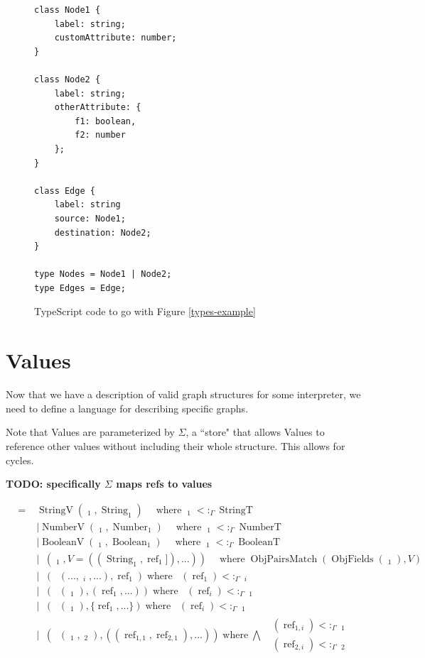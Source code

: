 \documentclass{article}
\DeclareMathOperator{\StringT}{StringT}
\DeclareMathOperator{\NumberT}{NumberT}
\DeclareMathOperator{\BooleanT}{BooleanT}
\DeclareMathOperator{\ListT}{ListT_\Gamma}
\DeclareMathOperator{\SetT}{SetT_\Gamma}
\DeclareMathOperator{\MapT}{MapT_\Gamma}
\DeclareMathOperator{\UnionT}{UnionT_\Gamma}
\DeclareMathOperator{\String}{String}
\DeclareMathOperator{\Number}{Number}
\DeclareMathOperator{\Boolean}{Boolean}
\DeclareMathOperator{\Type}{Type_\Gamma}
\DeclareMathOperator{\Value}{Value_\Sigma}
\DeclareMathOperator{\StringV}{StringV}
\DeclareMathOperator{\NumberV}{NumberV}
\DeclareMathOperator{\BooleanV}{BooleanV}
\DeclareMathOperator{\ObjV}{ObjV_\Sigma}
\DeclareMathOperator{\ListV}{ListV_\Sigma}
\DeclareMathOperator{\SetV}{SetV_\Sigma}
\DeclareMathOperator{\MapV}{MapV_\Sigma}
\DeclareMathOperator{\UnionV}{UnionV_\Sigma}
\DeclareMathOperator{\ValueType}{ValueType_\Sigma}
\DeclareMathOperator{\textref}{ref}
\DeclareMathOperator{\ObjFields}{ObjFields}
\DeclareMathOperator{\ObjPairsMatch}{ObjPairsMatch}
\DeclareMathOperator{\where}{ where }
\newcommand{\ValueRef}{\textref}
\newcommand{\subtype}{<:_\Gamma}
\begin{document}
\begin{figure}
\begin{mdframed}    
\begin{verbatim}
class Node1 {
    label: string;
    customAttribute: number;
}

class Node2 {
    label: string;
    otherAttribute: {
        f1: boolean,
        f2: number
    };
}

class Edge {
    label: string
    source: Node1;
    destination: Node2;
}

type Nodes = Node1 | Node2;
type Edges = Edge;
\end{verbatim}
\end{mdframed}
\caption{TypeScript code to go with Figure \ref{types-example}}
\label{types-example-code}
\end{figure}

\section{Values}

Now that we have a description of valid graph structures for some
interpreter, we need to define a language for describing specific 
graphs. 

Note that Values are parameterized by \(\Sigma\), a ``store" that
allows Values to reference other values without including their 
whole structure. This allows for cycles. 

\textbf{TODO: specifically \(\Sigma\) maps refs to values}

\begin{align*}
    \Value =& \StringV(\Type_1, \String_1) \quad\where \Type_1 \subtype \StringT \\
    &| \NumberV(\Type_1, \Number_1) \quad\where \Type_1 \subtype \NumberT \\
    &| \BooleanV(\Type_1, \Boolean_1) \quad\where \Type_1 \subtype \BooleanT \\
    &| \ObjV(\Type_1, V=((\String_1, \ValueRef_1]), ...)) \quad\where 
    \ObjPairsMatch(\ObjFields(\Type_1), V) \\
    &| \UnionV(\UnionT(..., \Type_i, ...), \ValueRef_1) \where
    \ValueType(\ValueRef_1) \subtype \Type_i\\
    &| \ListV(\ListT(\Type_1), (\ValueRef_1, ...)) \where \ValueType(\ValueRef_i) \subtype \Type_1 \\
    &| \SetV(\SetT(\Type_1), \{\ValueRef_1, ...\}) \where \ValueType(\ValueRef_i) \subtype \Type_1 \\
    &| \MapV(\MapT(\Type_1, \Type_2), ((\ValueRef_{1,1}, \ValueRef_{2,1}), ...)) \where \bigwedge
    \begin{aligned}
        \ValueType(\ValueRef_{1, i}) \subtype \Type_1 \\
        \ValueType(\ValueRef_{2, i}) \subtype \Type_2 
    \end{aligned}\\
\end{align*}
\end{document}
